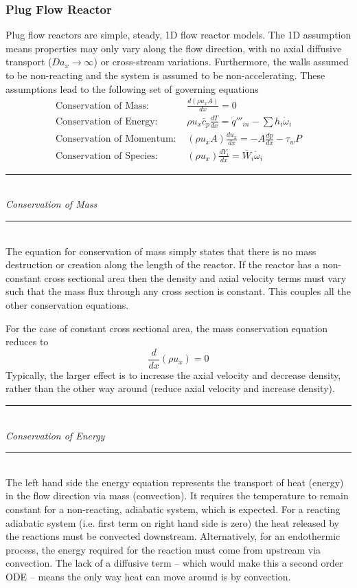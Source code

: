 \documentclass[11pt]{article}
\newcommand{\Header}[1]{\noindent\rule{\textwidth}{0.4pt}\\[0.3cm]\indent \large{\textit{#1}}\normalsize{}\\[-0.1cm]\noindent\rule{\textwidth}{0.4pt}}
\begin{document}
\subsubsection{Plug Flow Reactor}
Plug flow reactors are simple, steady, 1D flow reactor models. The 1D assumption means properties may only vary along the flow direction, with no axial diffusive transport ($Da_x\to\infty$) or cross-stream variations. Furthermore, the walls assumed to be non-reacting and the system is assumed to be non-accelerating. These assumptions lead to the following set of governing equations
\begin{align*}
\textrm{Conservation of Mass: } &\frac{d(\rho u_xA)}{dx} = 0\\
\textrm{Conservation of Energy: } &\rho u_x\bar c_p \frac{dT}{dx} = \dot q'''_{in} - \sum h_i\dot\omega_i\\
\textrm{Conservation of Momentum: } &(\rho u_xA)\frac{du_x}{dx} = -A\frac{dp}{dx} - \tau_wP\\
\textrm{Conservation of Species: } &(\rho u_x)\frac{dY_i}{dx} = \bar W_i \dot\omega_i
\end{align*}

\Header{Conservation of Mass}\\

The equation for conservation of mass simply states that there is no mass destruction or creation along the length of the reactor. If the reactor has a non-constant cross sectional area then the density and axial velocity terms must vary such that the mass flux through any cross section is constant. This couples all the other conservation equations.

For the case of constant cross sectional area, the mass conservation equation reduces to
$$\frac{d}{dx}(\rho u_x) = 0$$
Typically, the larger effect is to increase the axial velocity and decrease density, rather than the other way around (reduce axial velocity and increase density).\\

\Header{Conservation of Energy}\\

The left hand side the energy equation represents the transport of heat (energy) in the flow direction via mass (convection). It requires the temperature to remain constant for a non-reacting, adiabatic system, which is expected. For a reacting adiabatic system (i.e. first term on right hand side is zero) the heat released by the reactions must be convected downstream. Alternatively, for an endothermic process, the energy required for the reaction must come from upstream via convection. The lack of a diffusive term -- which would make this a second order ODE -- means the only way heat can move around is by convection.
\end{document}
